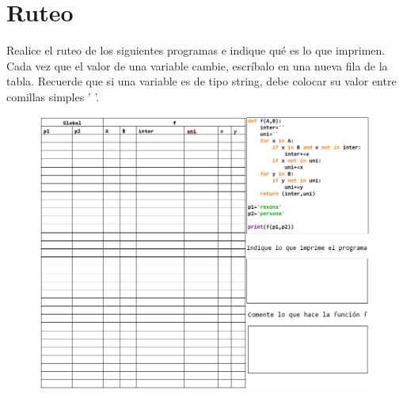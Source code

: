 \section{Ruteo}

Realice el ruteo de los siguientes programas e indique qué es lo que imprimen. Cada vez que el valor de una variable cambie, escríbalo en una nueva fila de la tabla. Recuerde que si una variable es de tipo string, debe colocar su valor entre comillas simples ’ ’.

\begin{figure}[H]
    \centering
    \includegraphics[scale=0.9]{Guia/ruteo1.png}    
\end{figure}